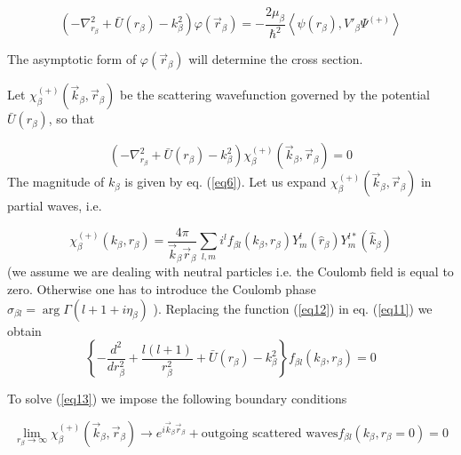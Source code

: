 \documentclass[a4paper,14pt]{book}
\begin{document}
\begin{equation}\label{eq10}
\left(-\nabla^2_{r_ \beta}+\bar U (r_ \beta)-k_\beta^2 \right)\varphi(\vec r_ \beta) =
-\frac{2 \mu_\beta}{\hbar^2}\left\langle  \psi(r_ \beta),V'_\beta \Psi^{(+)}\right\rangle
\end{equation}

The asymptotic form of $\varphi(\vec r_ \beta)$ will determine the cross section.


Let $\chi_\beta^{(+)}(\vec k_ \beta,\vec r_ \beta)$ be the scattering wavefunction governed by the potential $\bar U (r_ \beta)$, so that

\begin{equation}\label{eq11}
 \left(-\nabla^2_{r_ \beta}+\bar U (r_ \beta)-k_\beta^2 \right) \chi_\beta^{(+)}(\vec k_ \beta,\vec r_ \beta)=0
\end{equation}
The magnitude of $k_\beta$ is given by eq. (\ref{eq6}). Let us expand $\chi_\beta^{(+)}(\vec k_ \beta,\vec r_ \beta)$ in partial waves, i.e.

\begin{equation}\label{eq12}
\chi_\beta^{(+)}( k_ \beta, r_ \beta)=\frac{4\pi}{\vec k_ \beta \vec r_ \beta}\sum_{l,m} i^l f_{\beta l}( k_ \beta, r_ \beta) Y_m^l(\hat r_\beta)Y_m^{l*}(\hat k_\beta)
\end{equation}
(we assume we are dealing with neutral particles i.e. the Coulomb field is equal to zero. Otherwise one has to introduce the Coulomb phase $\sigma_{\beta l}=\arg \Gamma(l+1+i\eta_\beta)$ ).
Replacing the function (\ref{eq12}) in eq. (\ref{eq11}) we obtain
\begin{equation}\label{eq13}
\left\lbrace -\frac{d^2}{dr^2_\beta}+\frac{l(l+1)}{r^2_\beta}+\bar U (r_ \beta)-k_\beta^2\right\rbrace f_{\beta l}( k_ \beta, r_ \beta)=0
\end{equation}

To solve (\ref{eq13}) we impose the following boundary conditions

\begin{subequations}
 \begin{equation}\label{eq14a}
\lim_{r_\beta \rightarrow \infty} \chi_\beta^{(+)}(\vec k_ \beta,\vec r_ \beta) \longrightarrow e^{i \vec k_ \beta \vec r_ \beta} +
\text{outgoing scattered waves}
\end{equation}

\begin{equation}\label{eq14b}
f_{\beta l}( k_ \beta, r_ \beta=0)=0
\end{equation}

\end{subequations}
\end{document}
